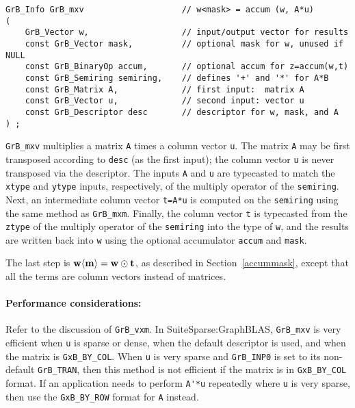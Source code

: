 \documentclass[12pt]{article}
\begin{document}
{\begin{mdframed}[userdefinedwidth=6in]
{\footnotesize
\begin{verbatim}
GrB_Info GrB_mxv                    // w<mask> = accum (w, A*u)
(
    GrB_Vector w,                   // input/output vector for results
    const GrB_Vector mask,          // optional mask for w, unused if NULL
    const GrB_BinaryOp accum,       // optional accum for z=accum(w,t)
    const GrB_Semiring semiring,    // defines '+' and '*' for A*B
    const GrB_Matrix A,             // first input:  matrix A
    const GrB_Vector u,             // second input: vector u
    const GrB_Descriptor desc       // descriptor for w, mask, and A
) ;
\end{verbatim} } \end{mdframed}

\verb'GrB_mxv' multiplies a matrix \verb'A' times a column vector \verb'u'.
The matrix \verb'A' may be first transposed according to \verb'desc' (as the
first input); the column vector \verb'u' is never transposed via the
descriptor.  The inputs \verb'A' and \verb'u' are typecasted to match the
\verb'xtype' and \verb'ytype' inputs, respectively, of the multiply operator of
the \verb'semiring'. Next, an intermediate column vector \verb't=A*u' is
computed on the \verb'semiring' using the same method as \verb'GrB_mxm'.
Finally, the column vector \verb't' is typecasted from the \verb'ztype' of the
multiply operator of the \verb'semiring' into the type of \verb'w', and the
results are written back into \verb'w' using the optional accumulator
\verb'accum' and \verb'mask'.

The last step is ${\bf w \langle m \rangle  = w \odot t}$, as described
in Section~\ref{accummask}, except that all the terms are column vectors instead
of matrices.

\paragraph{\bf Performance considerations:} %
Refer to the discussion of \verb'GrB_vxm'.  In SuiteSparse:GraphBLAS,
\verb'GrB_mxv' is very efficient when \verb'u' is sparse or dense, when the
default descriptor is used, and when the matrix is \verb'GxB_BY_COL'.  When
\verb'u' is very sparse and \verb'GrB_INP0' is set to its non-default
\verb'GrB_TRAN', then this method is not efficient if the matrix is in
\verb'GxB_BY_COL' format.  If an application needs to perform \verb"A'*u"
repeatedly where \verb'u' is very sparse, then use the \verb'GxB_BY_ROW' format
for \verb'A' instead.

}
\end{document}
